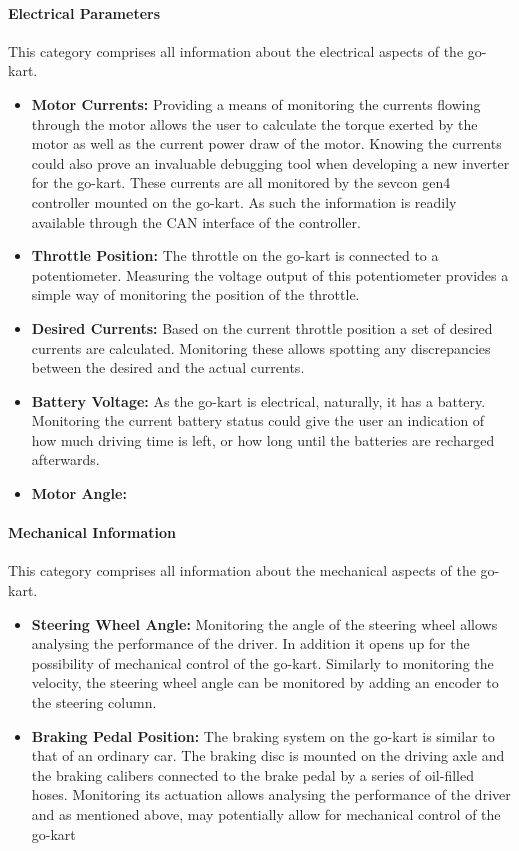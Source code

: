 \paragraph*{Electrical Parameters}
This category comprises all information about the electrical aspects of the go-kart.
\begin{itemize}
	\item \textbf{Motor Currents:} Providing a means of monitoring the currents flowing through the motor allows the user to calculate the torque exerted by the motor as well as the current power draw of the motor.
	Knowing the currents could also prove an invaluable debugging tool when developing a new inverter for the go-kart.
	These currents are all monitored by the sevcon gen4 controller mounted on the go-kart.
	As such the information is readily available through the CAN interface of the controller.
	\item \textbf{Throttle Position:} The throttle on the go-kart is connected to a potentiometer.
	Measuring the voltage output of this potentiometer provides a simple way of monitoring the position of the throttle.
	\item \textbf{Desired Currents:} Based on the current throttle position a set of desired currents are calculated.
	Monitoring these allows spotting any discrepancies between the desired and the actual currents.
	\item \textbf{Battery Voltage:} As the go-kart is electrical, naturally, it has a battery.
	Monitoring the current battery status could give the user an indication of how much driving time is left, or how long until the batteries are recharged afterwards.
	\item \textbf{Motor Angle:}
\end{itemize}
\paragraph*{Mechanical Information}
This category comprises all information about the mechanical aspects of the go-kart.
\begin{itemize}
	\item \textbf{Steering Wheel Angle:} Monitoring the angle of the steering wheel allows analysing the performance of the driver.
	In addition it opens up for the possibility of mechanical control of the go-kart.
	Similarly to monitoring the velocity, the steering wheel angle can be monitored by adding an encoder to the steering column.
	\item \textbf{Braking Pedal Position:} The braking system on the go-kart is similar to that of an ordinary car.
	The braking disc is mounted on the driving axle and the braking calibers connected to the brake pedal by a series of oil-filled hoses.
	Monitoring its actuation allows analysing the performance of the driver and as mentioned above, may potentially allow for mechanical control of the go-kart
\end{itemize}

